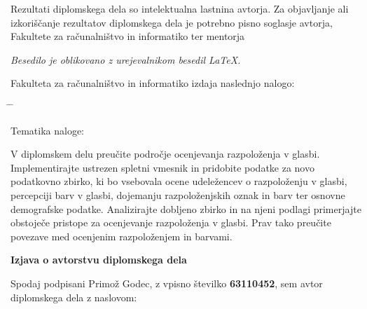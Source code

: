 \documentclass[a4paper, 12pt]{book}
\newcommand{\clearemptydoublepage}{\newpage{\pagestyle{empty}\cleardoublepage}}
\begin{document}
\thispagestyle{empty}
\vspace*{8cm}
{\small \noindent
Rezultati diplomskega dela so intelektualna lastnina avtorja.
Za objavljanje ali izkoriščanje rezultatov di\-plom\-ske\-ga dela je potrebno pisno soglasje avtorja, Fakultete za ra\-ču\-nal\-niš\-tvo in
informatiko ter mentorja%



\begin{center}
\mbox{}\vfill
\emph{Besedilo je oblikovano z urejevalnikom besedil \LaTeX.}
\end{center}
\clearemptydoublepage

\thispagestyle{empty}
\vspace*{4cm}

\noindent
Fakulteta za računalništvo in informatiko izdaja naslednjo nalogo:
\medskip
\begin{tabbing}
\hspace{32mm}\= \hspace{6cm} \= \kill




Tematika naloge:
\end{tabbing}
V diplomskem delu preučite področje ocenjevanja razpoloženja v glasbi. Implementirajte ustrezen spletni vmesnik in pridobite podatke za novo podatkovno zbirko, ki bo vsebovala ocene udeležencev o razpoloženju v glasbi, percepciji barv v glasbi, dojemanju razpoloženjskih oznak in barv ter osnovne demografske podatke. Analizirajte dobljeno zbirko in na njeni podlagi primerjajte obstoječe pristope za ocenjevanje razpoloženja v glasbi. Prav tako preučite povezave med ocenjenim razpoloženjem in barvami.
\vspace{15mm}






\vspace{2cm}

\clearemptydoublepage

\vspace*{1cm}
\begin{center}
{\Large \textbf{\sc Izjava o avtorstvu diplomskega dela}}
\end{center}

\vspace{1cm}
\noindent Spodaj podpisani Primož Godec,
z vpisno številko \textbf{63110452}, sem avtor  diplomskega dela z naslovom:

}
\end{document}
